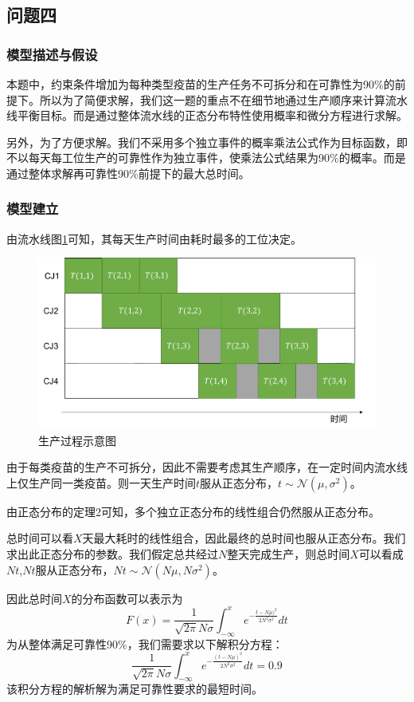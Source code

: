 \documentclass[UTF8]{ctexart}
\begin{document}
	\subsection{问题四}
	\subsubsection{模型描述与假设}
	本题中，约束条件增加为每种类型疫苗的生产任务不可拆分和在可靠性为90\%的前提下。所以为了简便求解，我们这一题的重点不在细节地通过生产顺序来计算流水线平衡目标。而是通过整体流水线的正态分布特性使用概率和微分方程进行求解。
	
	另外，为了方便求解。我们不采用多个独立事件的概率乘法公式作为目标函数，即不以每天每工位生产的可靠性作为独立事件，使乘法公式结果为90\%的概率。而是通过整体求解再可靠性90\%前提下的最大总时间。
	\subsubsection{模型建立}
	由流水线图\ref{pipeline2}可知，其每天生产时间由耗时最多的工位决定。
	\begin{figure}[H]
		\centering %
		\includegraphics[scale=0.5]{pipe2.pdf}
		\caption{生产过程示意图}\label{pipeline2}
	\end{figure}
	由于每类疫苗的生产不可拆分，因此不需要考虑其生产顺序，在一定时间内流水线上仅生产同一类疫苗。则一天生产时间$t$服从正态分布，$t\sim\mathcal{N}(\mu,\sigma^2)$。
	
	由正态分布的定理2可知，多个独立正态分布的线性组合仍然服从正态分布。
	
	总时间可以看$X$天最大耗时的线性组合，因此最终的总时间也服从正态分布。我们求出此正态分布的参数。我们假定总共经过$N$整天完成生产，则总时间$X$可以看成$Nt$,$Nt$服从正态分布，$Nt\sim\mathcal{N}(N\mu,N\sigma^2)$。
	
	因此总时间$X$的分布函数可以表示为
	\begin{equation}
	F(x)=\frac{1}{\sqrt{2\pi}N\sigma}\int^{x}_{-\infty}e^{-\frac{t-N\mu)^2}{2N^2\sigma^2}}dt
	\end{equation}
	为从整体满足可靠性90\%，我们需要求以下解积分方程：
	\begin{equation}
	\frac{1}{\sqrt{2\pi}N\sigma}\int^{x}_{-\infty}e^{-\frac{(t-N\mu)^2}{2N^2\sigma^2}}dt = 0.9
	\end{equation}
	该积分方程的解析解为满足可靠性要求的最短时间。
\end{document}
